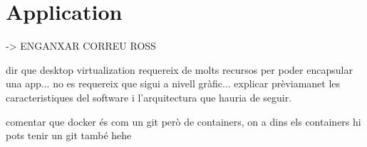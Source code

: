 \chapter{Application}\label{D:application}

-> ENGANXAR CORREU ROSS

dir que desktop virtualization requereix de molts recursos per poder encapsular una app... no es requereix que sigui a nivell gràfic... explicar prèviamanet les caracteristiques del software i l'arquitectura que hauria de seguir.

comentar que docker és com un git però de containers, on a dins els containers hi pots tenir un git també hehe